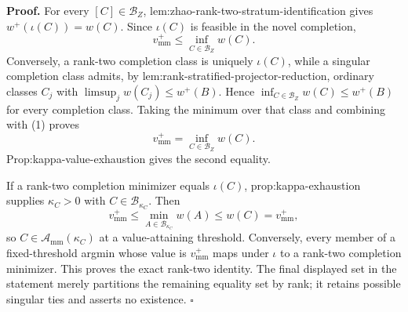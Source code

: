 \textbf{Proof.}
For every \([C]\in\mathcal B_Z\), lem:zhao-rank-two-stratum-identification gives \(w^+(\iota(C))=w(C)\).  Since \(\iota(C)\) is feasible in the novel completion,
\[
 v_{\mathrm{mm}}^+\le\inf_{C\in\mathcal B_Z}w(C). \tag{1}
\]
Conversely, a rank-two completion class is uniquely \(\iota(C)\), while a singular completion class admits, by lem:rank-stratified-projector-reduction, ordinary classes \(C_j\) with \(\limsup_jw(C_j)\le w^+(B)\).  Hence \(\inf_{C\in\mathcal B_Z}w(C)\le w^+(B)\) for every completion class.  Taking the minimum over that class and combining with (1) proves
\[
 v_{\mathrm{mm}}^+=\inf_{C\in\mathcal B_Z}w(C).
\]
Prop:kappa-value-exhaustion gives the second equality.

If a rank-two completion minimizer equals \(\iota(C)\), prop:kappa-exhaustion supplies \(\kappa_C>0\) with \(C\in\mathcal B_{\kappa_C}\).  Then
\[
 v_{\mathrm{mm}}^+
 \le\min_{A\in\mathcal B_{\kappa_C}}w(A)
 \le w(C)=v_{\mathrm{mm}}^+,
\]
so \(C\in\mathcal A_{\mathrm{mm}}(\kappa_C)\) at a value-attaining threshold.  Conversely, every member of a fixed-threshold argmin whose value is \(v_{\mathrm{mm}}^+\) maps under \(\iota\) to a rank-two completion minimizer.  This proves the exact rank-two identity.  The final displayed set in the statement merely partitions the remaining equality set by rank; it retains possible singular ties and asserts no existence. \(\square\)